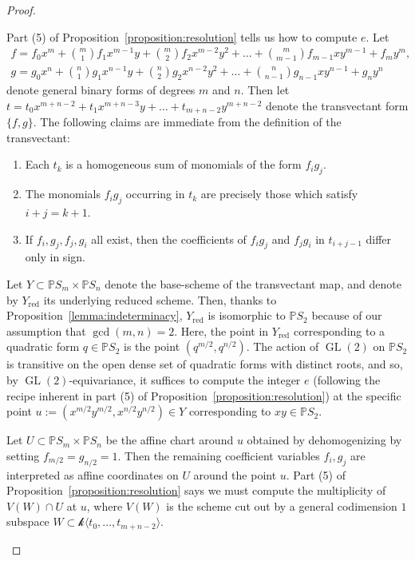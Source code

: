 \documentclass[12pt]{article}
\theoremstyle{plain}
\theoremstyle{remark}
\renewcommand{\P}{\mathbb{P}}
\newcommand{\GL}{\operatorname{GL}}
\newcommand{\red}{\operatorname{red}}
\renewcommand{\k}{\mathscr{k}}
\begin{document}
\begin{proof}
\begin{enumerate}
        Part (5) of Proposition~\ref{proposition:resolution} tells us how to compute $e$.  Let
        \begin{align*}
        f = f_{0}x^{m} + {m \choose 1} f_{1}x^{m-1}y + {m \choose 2} f_{2}x^{m-2}y^{2} + \dots + {m \choose m-1} f_{m-1}xy^{m-1} + f_{m}y^{m},\\
        g = g_{0}x^{n} + {n \choose 1} g_{1}x^{n-1}y + {n \choose 2} g_{2}x^{n-2}y^{2} + \dots + {n \choose n-1} g_{n-1}xy^{n-1} + g_{n}y^{n}
        \end{align*}
        denote general binary forms of degrees $m$ and $n$.   Then let
        $t = t_0 x^{m+n-2} + t_{1}x^{m+n-3}y + \dots + t_{m+n-2}y^{m+n-2}$
        denote the transvectant form $\{f,g\}$. The following claims are immediate from the definition of the transvectant:
        \begin{enumerate}
            \item Each $t_{k}$ is a homogeneous sum of monomials of the form $f_{i}g_{j}$.
            \item The monomials $f_{i}g_{j}$ occurring in $t_{k}$ are precisely those which satisfy $i+j = k+1$.
            \item If $f_{i}, g_{j}, f_{j}, g_{i}$ all exist, then the coefficients of $f_{i}g_{j}$ and $f_{j}g_{i}$ in $t_{i+j-1}$ differ only in sign.
        \end{enumerate}

        Let $Y \subset \P S_{m} \times \P S_{n}$ denote the base-scheme of the transvectant map, and denote by $Y_{\red}$ its underlying reduced scheme. Then, thanks to Proposition~\ref{lemma:indeterminacy}, $Y_{\red}$ is isomorphic to $\P S_{2}$ because of our assumption that $\gcd(m,n) = 2$.  Here, the point in $Y_{\red}$ corresponding to a quadratic form $q \in \P S_{2}$ is the point $(q^{m/2}, q^{n/2})$.  The action of $\GL(2)$ on $\P S_{2}$ is transitive on the open dense set of quadratic forms with distinct roots, and so, by $\GL(2)$-equivariance, it suffices to compute the integer $e$ (following the recipe inherent in part (5) of Proposition~\ref{proposition:resolution}) at the specific point $u := (x^{m/2}y^{m/2}, x^{n/2}y^{n/2}) \in Y$ corresponding to $xy \in \P S_{2}$.

        Let $U \subset \P S_{m} \times \P S_{n}$ be the affine chart around $u$ obtained by dehomogenizing by setting $f_{m/2} = g_{n/2} = 1$. Then the remaining coefficient variables $f_i, g_j$ are interpreted as affine coordinates on $U$ around the point $u$. Part (5) of Proposition~\ref{proposition:resolution} says we must compute the multiplicity of $V(W) \cap U$ at $u$, where $V(W)$ is the scheme cut out by a general codimension $1$ subspace $W \subset \k \langle t_0, \dots, t_{m+n-2} \rangle$.


\end{enumerate}
\end{proof}
\end{document}
